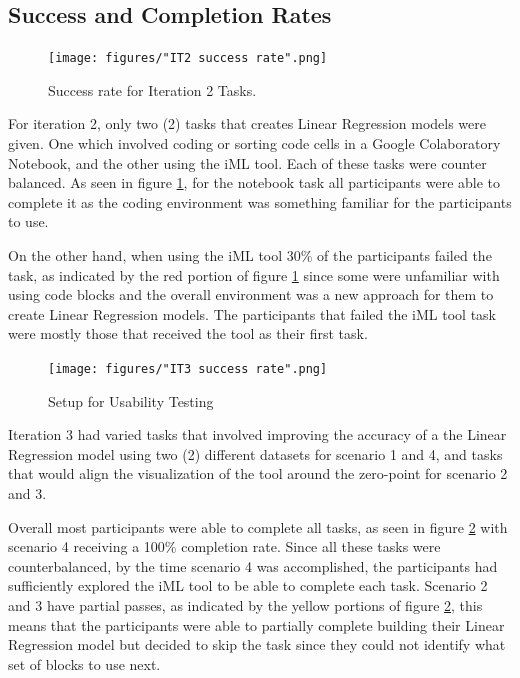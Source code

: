 \documentclass{sigchi}
\begin{document}
\subsection{Success and Completion Rates}

\begin{figure}[t]
    \centering
    \texttt{[image: figures/"IT2 success rate".png]}
    \caption{Success rate for Iteration 2 Tasks.}
    \label{fig:it2successrate}
\end{figure}

For iteration 2, only two (2) tasks that creates Linear Regression models were given. One which involved coding or sorting code cells in a Google Colaboratory Notebook, and the other using the iML tool. Each of these tasks were counter balanced. As seen in figure \ref{fig:it2successrate}, for the notebook task all participants were able to complete it as the coding environment was something familiar for the participants to use. 

On the other hand, when using the iML tool 30\% of the participants failed the task, as indicated by the red portion of figure \ref{fig:it2successrate} since some were unfamiliar with using code blocks and the overall environment was a new approach for them to create Linear Regression models. The participants that failed the iML tool task were mostly those that received the tool as their first task.

\begin{figure}[t]
    \centering
    \texttt{[image: figures/"IT3 success rate".png]}
    \caption{Setup for Usability Testing}
    \label{fig:it3successrate}
\end{figure}

Iteration 3 had varied tasks that involved improving the accuracy of a the Linear Regression model using two (2) different datasets for scenario 1 and 4, and tasks that would align the visualization of the tool around the zero-point for scenario 2 and 3. 

Overall most participants were able to complete all tasks, as seen in figure \ref{fig:it3successrate} with scenario 4 receiving a 100\% completion rate. Since all these tasks were counterbalanced, by the time scenario 4 was accomplished, the participants had sufficiently explored the iML tool to be able to complete each task. Scenario 2 and 3 have partial passes, as indicated by the yellow portions of figure \ref{fig:it3successrate}, this means that the participants were able to partially complete building their Linear Regression model but decided to skip the task since they could not identify what set of blocks to use next. 
\end{document}
